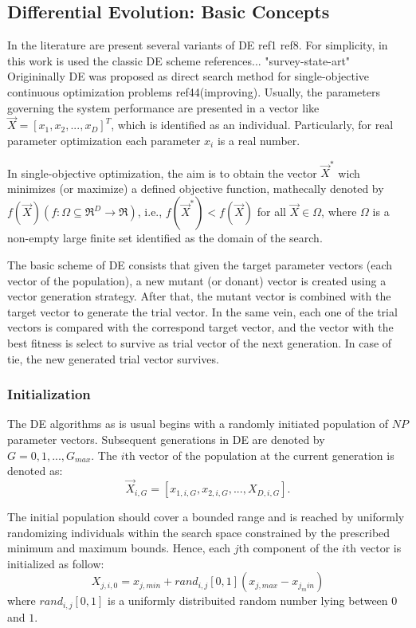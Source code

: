 \subsection{Differential Evolution: Basic Concepts}
In the literature are present several variants of DE ref1 ref8.
%
For simplicity, in this work is used the classic DE scheme references... "survey-state-art"
%
Origininally DE was proposed as direct search method for single-objective continuous optimization problems ref44(improving).
%
Usually, the parameters governing the system performance are presented in a vector like $\vec{X} = [x_1, x_2, ..., x_D ]^T$, which is identified as an individual.
%
Particularly, for real parameter optimization each parameter $x_i$ is a real number.
%

In single-objective optimization, the aim is to obtain the vector $\vec{X}^*$ wich minimizes (or maximize) a defined objective function, mathecally denoted by $f(\vec{X})(f : \Omega \subseteq \Re^D \rightarrow \Re)$, i.e., $f(\vec{X}^*) < f(\vec{X})$ for all $\vec{X} \in \Omega$, where $\Omega$ is a non-empty large finite set identified as the domain of the search.
%

The basic scheme of DE consists that given the target parameter vectors (each vector of the population), a new mutant (or donant) vector is created using a vector generation strategy.
%
After that, the mutant vector is combined with the target vector to generate the trial vector.
%
In the same vein, each one of the trial vectors is compared with the correspond target vector, and the vector with the best fitness is select to survive as trial vector of the next generation.
%
In case of tie, the new generated trial vector survives.


\subsubsection{Initialization}


The DE algorithms as is usual begins with a randomly initiated population of $NP$ parameter vectors.
%
Subsequent generations in DE are denoted by $G= 0,1, ..., G_{max}$.
%
The $i$th vector of the population at the current generation is denoted as:
\begin{equation} 
\vec{X}_{i,G} = [x_{1,i,G}, x_{2,i,G},..., X_{D,i, G}].
\end{equation}
%

The initial population should cover a bounded range and is reached by uniformly randomizing individuals within the search space constrained by the prescribed minimum and maximum bounds.
%
Hence, each $j$th component of the $i$th vector is initialized as follow:
\begin{equation}
X_{j,i,0} = x_{j,min} + rand_{i,j}[0,1] (x_{j,max} - x_{j_min})
\end{equation}
where $rand_{i,j}[0,1]$ is a uniformly distribuited random number lying between $0$ and $1$.

